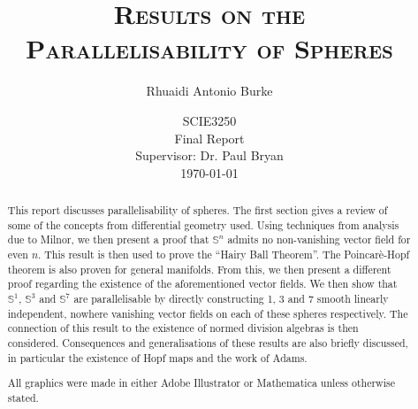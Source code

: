 \documentclass[12pt,a4paper]{article}
\numberwithin{equation}{section}
\theoremstyle{definition}
\theoremstyle{remark}
\begin{document}

\vspace{1cm}
\title{    
    \textsc{Results on the \\Parallelisability of Spheres}
    }
    
    \vspace{1cm}
    
    \author{Rhuaidi Antonio Burke}  
    
    \vspace{1cm}
    
    \date{
    \large SCIE3250 \\ Final Report \\ 
    \vspace{1cm}
    \large Supervisor: Dr. Paul Bryan \\
    \vspace{1cm}
    \today
    }

    \maketitle
    \setlength{\parindent}{0pt}

\vspace{2cm}
\begin{abstract}
\noindent This report discusses parallelisability of spheres. The first section gives a review of some of the concepts from differential geometry used. Using techniques from analysis due to Milnor, we then present a proof that $\mathbb{S}^n$ admits no non-vanishing vector field for even $n$. This result is then used to prove the ``Hairy Ball Theorem''. The Poincar\`{e}-Hopf theorem is also proven for general manifolds. From this, we then present a different proof regarding the existence of the aforementioned vector fields.
We then show that $\mathbb{S}^1$, $\mathbb{S}^3$ and $\mathbb{S}^7$ are parallelisable by directly constructing 1, 3 and 7 smooth linearly independent, nowhere vanishing vector fields on each of these spheres respectively. The connection of this result to the existence of normed division algebras is then considered. Consequences and generalisations of these results are also briefly discussed, in particular the existence of Hopf maps and the work of Adams.\\
\begin{center}
\noindent All graphics were made in either Adobe Illustrator or Mathematica unless otherwise stated.
\end{center}
\end{abstract}
\end{document}
